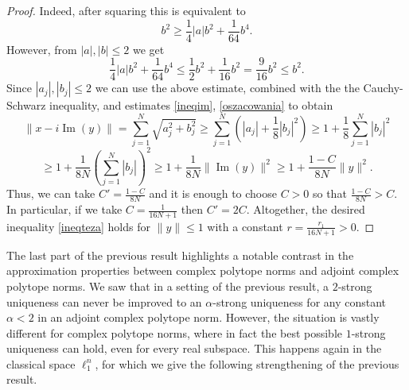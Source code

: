 \documentclass[12pt, reqno]{amsart}
\theoremstyle{definition}
\theoremstyle{remark}
\numberwithin{equation}{section}
\DeclareMathOperator{\im}{Im}
\begin{document}
\begin{proof}
Indeed, after squaring this is equivalent to
$$b^2 \geq \frac{1}{4}|a|b^2 + \frac{1}{64}b^4.$$
However, from $|a|, |b| \leq 2$ we get
$$\frac{1}{4}|a|b^2 + \frac{1}{64}b^4 \leq \frac{1}{2}b^2 + \frac{1}{16}b^2 = \frac{9}{16} b^2 \leq b^2.$$
Since $|a_j|, |b_j| \leq 2$ we can use the above estimate, combined with the the Cauchy-Schwarz inequality, and estimates \eqref{ineqim},  \eqref{oszacowania} to obtain
$$\|x - i\im(y)\| = \sum_{j=1}^{N} \sqrt{a_j^2 + b_j^2} \geq \sum_{j=1}^{N} \left ( |a_j| + \frac{1}{8} |b_j|^2 \right ) \geq 1 + \frac{1}{8} \sum_{j=1}^{N} |b_j|^2$$
$$ \geq 1 + \frac{1}{8N} \left ( \sum_{j=1}^{N} |b_j| \right )^2 \geq 1 + \frac{1}{8N} \|\im(y)\|^2 \geq 1 + \frac{1-C}{8N}\|y\|^2.$$
Thus, we can take $C' = \frac{1-C}{8N}$ and it is enough to choose $C>0$ so that $\frac{1-C}{8N} > C$. In particular, if we take $C=\frac{1}{16N+1}$ then $C'=2C$. Altogether, the desired inequality \eqref{ineqteza} holds for $\|y\| \leq 1$ with a constant $ r = \frac{r_1}{16N+1}>0$.
\end{proof}

The last part of the previous result highlights a notable contrast in the approximation properties between complex polytope norms and adjoint complex polytope norms. We saw that in a setting of the previous result, a $2$-strong uniqueness can never be improved to an $\alpha$-strong uniqueness for any constant $\alpha<2$ in an adjoint complex polytope norm. However, the situation is vastly different for complex polytope norms, where in fact the best possible $1$-strong uniqueness can hold, even for every real subspace. This happens again in the classical space $\ell_1^n$, for which we give the following strengthening of the previous result. 
\end{document}
